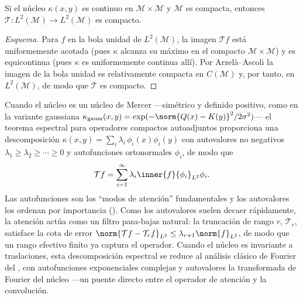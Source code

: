 \begin{proposition}
\label{prop:apps:attn-compact}
Si el n\'ucleo $\kappa(x,y)$ es continuo en $\mathcal{M}\times\mathcal{M}$ y
$\mathcal{M}$ es compacta, entonces
$\mathcal{T}: L^2(\mathcal{M})\to L^2(\mathcal{M})$ es compacto.
\end{proposition}

\begin{proof}[Esquema]
Para $f$ en la bola unidad de $L^2(\mathcal{M})$, la imagen $\mathcal{T}f$ est\'a
uniformemente acotada (pues $\kappa$ alcanza su m\'aximo en el compacto
$\mathcal{M}\times\mathcal{M}$) y es equicontinua (pues $\kappa$ es
uniformemente continua all\'i). Por Arzel\`a--Ascoli la imagen de la bola unidad
es relativamente compacta en $C(\mathcal{M})$ y, por tanto, en
$L^2(\mathcal{M})$, de modo que $\mathcal{T}$ es compacto.
\end{proof}

Cuando el n\'ucleo es un n\'ucleo de Mercer ---sim\'etrico y definido positivo,
como en la variante gaussiana
$\kappa_{\text{gauss}}(x,y) = \exp(-\norm{Q(x)-K(y)}^2/2\sigma^2)$--- el teorema
espectral para operadores compactos autoadjuntos proporciona una descomposici\'on
$\kappa(x,y) = \sum_{i} \lambda_i\,\phi_i(x)\phi_i(y)$ con autovalores no
negativos $\lambda_1\ge\lambda_2\ge\cdots\ge 0$ y autofunciones ortonormales
$\phi_i$, de modo que
\[
  \mathcal{T}f = \sum_{i=1}^{\infty}\lambda_i \inner{f}{\phi_i}_{L^2}\phi_i .
\]
Las autofunciones son los ``modos de atenci\'on'' fundamentales y los autovalores
los ordenan por importancia (). Como los autovalores
suelen decaer r\'apidamente, la atenci\'on act\'ua como un filtro pasa-bajas
natural: la truncaci\'on de rango $r$, $\mathcal{T}_r$, satisface la cota de error
$\norm{\mathcal{T}f - \mathcal{T}_r f}_{L^2}\le \lambda_{r+1}\norm{f}_{L^2}$, de
modo que un rango efectivo finito ya captura el operador. Cuando el n\'ucleo es
invariante a traslaciones, esta descomposici\'on espectral se reduce al
an\'alisis cl\'asico de Fourier del , con autofunciones
exponenciales complejas y autovalores la transformada de Fourier del n\'ucleo
---un puente directo entre el operador de atenci\'on y la convoluci\'on.

